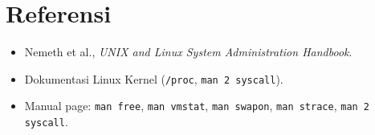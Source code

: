 \section{Referensi}

\begin{itemize}
    \item Nemeth et al., \textit{UNIX and Linux System Administration Handbook}.
    \item Dokumentasi Linux Kernel (\texttt{/proc}, \texttt{man 2 syscall}).
    \item Manual page: \texttt{man free}, \texttt{man vmstat}, \texttt{man swapon},
    \texttt{man strace}, \texttt{man 2 syscall}.
\end{itemize}
